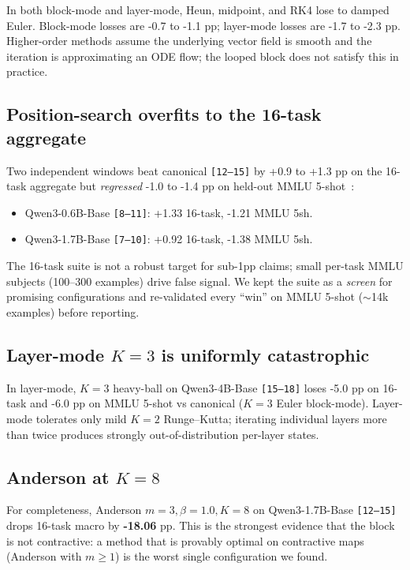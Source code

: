In both block-mode and layer-mode, Heun, midpoint, and RK4 lose to damped Euler. Block-mode losses are -0.7 to -1.1 pp; layer-mode losses are -1.7 to -2.3 pp. Higher-order methods assume the underlying vector field is smooth and the iteration is approximating an ODE flow; the looped block does not satisfy this in practice.

\subsection{Position-search overfits to the 16-task aggregate}

Two independent windows beat canonical \texttt{[12--15]} by +0.9 to +1.3 pp on the 16-task aggregate but \emph{regressed} -1.0 to -1.4 pp on held-out MMLU 5-shot~\citep{hendrycks2021mmlu}:
\begin{itemize}
\item Qwen3-0.6B-Base \texttt{[8--11]}: +1.33 16-task, -1.21 MMLU 5sh.
\item Qwen3-1.7B-Base \texttt{[7--10]}: +0.92 16-task, -1.38 MMLU 5sh.
\end{itemize}
The 16-task suite is not a robust target for sub-1pp claims; small per-task MMLU subjects (100--300 examples) drive false signal. We kept the suite as a \emph{screen} for promising configurations and re-validated every ``win'' on MMLU 5-shot ($\sim$14k examples) before reporting.

\subsection{Layer-mode \texorpdfstring{$K{=}3$}{K=3} is uniformly catastrophic}

In layer-mode, $K{=}3$ heavy-ball on Qwen3-4B-Base \texttt{[15--18]} loses -5.0 pp on 16-task and -6.0 pp on MMLU 5-shot vs canonical ($K{=}3$ Euler block-mode). Layer-mode tolerates only mild $K{=}2$ Runge--Kutta; iterating individual layers more than twice produces strongly out-of-distribution per-layer states.

\subsection{Anderson at \texorpdfstring{$K{=}8$}{K=8}}

For completeness, Anderson $m{=}3,\beta{=}1.0,K{=}8$ on Qwen3-1.7B-Base \texttt{[12--15]} drops 16-task macro by \textbf{-18.06} pp. This is the strongest evidence that the block is not contractive: a method that is provably optimal on contractive maps (Anderson with $m \geq 1$) is the worst single configuration we found.

